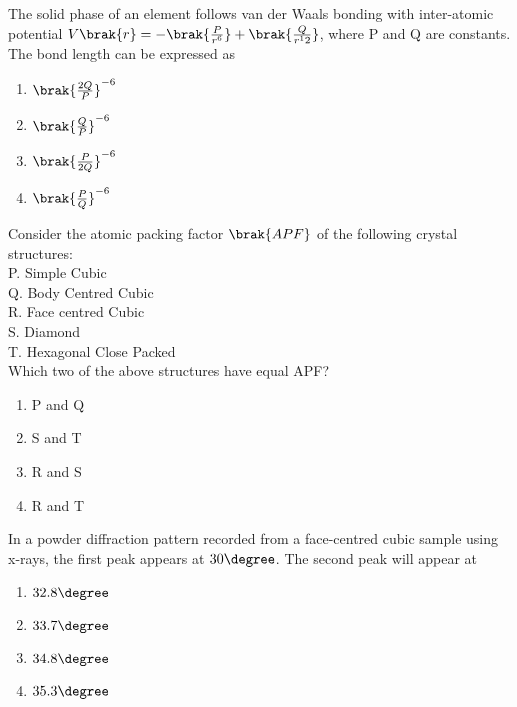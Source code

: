 \iffalse
  \title{GATEAssignment-1}
  \author{EE24BTECH11048-NITHIN.K}
  \section{ph}
  \chapter{2007}
\fi

	\item The solid phase of an element follows van der Waals bonding with inter-atomic potential $V\brak{r} = -\brak{\frac{P}{r^6}} + \brak{\frac{Q}{r^12}}$, where P and Q are constants. The bond length can be expressed as
		\begin{enumerate}
			\item $\brak{\frac{2Q}{P}}^{-6}$
			\item $\brak{\frac{Q}{P}}^{-6}$
			\item $\brak{\frac{P}{2Q}}^{-6}$
			\item $\brak{\frac{P}{Q}}^{-6}$
		\end{enumerate}
	\item Consider the atomic packing factor $\brak{APF}$ of the following crystal structures: \\
		P. Simple Cubic \\
		Q. Body Centred Cubic \\
		R. Face centred Cubic \\
		S. Diamond \\
		T. Hexagonal Close Packed \\
		Which two of the above structures have equal APF?
		\begin{enumerate}
			\item P and Q
			\item S and T
			\item R and S
			\item R and T
		\end{enumerate}
	\item In a powder diffraction pattern recorded from a face-centred cubic sample using x-rays, the first peak appears at $30\degree$. The second peak will appear at
		\begin{enumerate}
			\item $32.8\degree$
			\item $33.7\degree$
			\item $34.8\degree$
			\item $35.3\degree$
		\end{enumerate}
